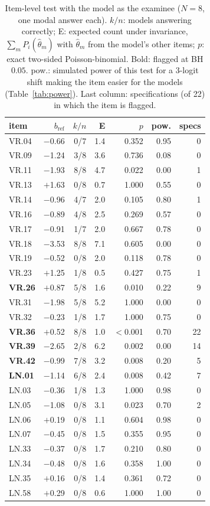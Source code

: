 \begin{table}[t]
\caption{Item-level test with the model as the examinee ($N=8$, one modal answer each). $k/n$: models answering correctly; E: expected count under invariance, $\sum_m P_i(\hat\theta_m)$ with $\hat\theta_m$ from the model's other items; $p$: exact two-sided Poisson-binomial. Bold: flagged at BH $0.05$. pow.: simulated power of this test for a 3-logit shift making the item easier for the models (Table~\ref{tab:power}). Last column: specifications (of 22) in which the item is flagged.}
\label{tab:unit}\centering\small
\setlength{\tabcolsep}{4pt}\begin{tabular}{lrrrrrr}\toprule
item & $b_{\text{ref}}$ & $k/n$ & E & $p$ & pow. & specs \\\midrule
VR.04 & $-$0.66 & 0/7 & 1.4 & 0.352 & 0.95 & 0 \\
VR.09 & $-$1.24 & 3/8 & 3.6 & 0.736 & 0.08 & 0 \\
VR.11 & $-$1.93 & 8/8 & 4.7 & 0.022 & 0.00 & 1 \\
VR.13 & $+$1.63 & 0/8 & 0.7 & 1.000 & 0.55 & 0 \\
VR.14 & $-$0.96 & 4/7 & 2.0 & 0.105 & 0.80 & 1 \\
VR.16 & $-$0.89 & 4/8 & 2.5 & 0.269 & 0.57 & 0 \\
VR.17 & $-$0.91 & 1/7 & 2.0 & 0.667 & 0.78 & 0 \\
VR.18 & $-$3.53 & 8/8 & 7.1 & 0.605 & 0.00 & 0 \\
VR.19 & $-$0.52 & 0/8 & 2.0 & 0.118 & 0.78 & 0 \\
VR.23 & $+$1.25 & 1/8 & 0.5 & 0.427 & 0.75 & 1 \\
\textbf{VR.26} & $+$0.87 & 5/8 & 1.6 & 0.010 & 0.22 & 9 \\
VR.31 & $-$1.98 & 5/8 & 5.2 & 1.000 & 0.00 & 0 \\
VR.32 & $-$0.23 & 1/8 & 1.7 & 1.000 & 0.75 & 0 \\
\textbf{VR.36} & $+$0.52 & 8/8 & 1.0 & $<$0.001 & 0.70 & 22 \\
\textbf{VR.39} & $-$2.65 & 2/8 & 6.2 & 0.002 & 0.00 & 14 \\
\textbf{VR.42} & $-$0.99 & 7/8 & 3.2 & 0.008 & 0.20 & 5 \\
\textbf{LN.01} & $-$1.14 & 6/8 & 2.4 & 0.008 & 0.42 & 7 \\
LN.03 & $-$0.36 & 1/8 & 1.3 & 1.000 & 0.98 & 0 \\
LN.05 & $-$1.08 & 0/8 & 3.1 & 0.023 & 0.70 & 2 \\
LN.06 & $+$0.19 & 0/8 & 1.1 & 0.604 & 0.98 & 0 \\
LN.07 & $-$0.45 & 0/8 & 1.5 & 0.355 & 0.95 & 0 \\
LN.33 & $-$0.37 & 0/8 & 1.7 & 0.210 & 0.80 & 0 \\
LN.34 & $-$0.48 & 0/8 & 1.6 & 0.358 & 1.00 & 0 \\
LN.35 & $+$0.16 & 0/8 & 1.4 & 0.361 & 0.72 & 0 \\
LN.58 & $+$0.29 & 0/8 & 0.6 & 1.000 & 1.00 & 0 \\
\bottomrule\end{tabular}\end{table}
